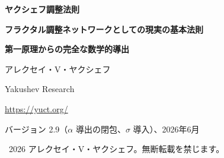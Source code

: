 \documentclass[12pt,a4paper]{article}
\theoremstyle{remark}
\begin{document}
	
	\begin{titlepage}
		\centering
		\vspace*{2cm}
		
		{\Huge\bfseries ヤクシェフ調整法則\par}
		\vspace{0.5cm}
		{\Large\bfseries フラクタル調整ネットワークとしての現実の基本法則\par}
		\vspace{0.3cm}
		{\Large\bfseries 第一原理からの完全な数学的導出\par}
		
		\vspace{1.5cm}
		
		{\large アレクセイ・V・ヤクシェフ\par}
		\vspace{0.3cm}
		{\normalsize Yakushev Research\par}
		\vspace{0.2cm}
		{\normalsize \url{https://yuct.org/}\par}
		
		\vspace{1.0cm}
		{\normalsize バージョン 2.9（$\alpha$ 導出の閉包、$\sigma$ 導入）、2026年6月\par}
		
		\vfill
		
		\begin{abstract}
			\noindent
			我々は、宇宙内のすべての安定構造を支配する基本原理であるヤクシェフ調整法則の完全な数学的導出を提示する。この法則は単一の文で定式化され、一つの公理（フラクタルスケール不変性）と調整プロトコル YPSDC の定義から導かれる。我々は三つの構造定理を証明する：最小辞書エントロピーは正確に 2 ビットであり、空間次元は必然的に 3 であり、時間は調整の不完全性の創発的尺度である。普遍的誤差法則は、その正しい定常べき則形式 $\varepsilon = \kappa_c \alpha K_{\mathrm{eff}}^{-\beta}$（$\beta=2/3$、$\kappa_c=1/3$）で導出される。代数的ループ定数は $S_{\mathrm{odd}}=1.2$、$S_{\mathrm{even}}=0.8$ である。スケール量子 $q = (3/2)^{1/3}$ は普遍的質量梯子を生成する。微細構造定数 $\alpha^{-1} \approx 137.036$ はコンパクトファイバー $F_{18}$ の位相不変量と普遍的シフト $\sigma = (S_{\mathrm{odd}}-S_{\mathrm{even}})/2 = 0.20$ から、いかなる経験的フィッティングもなしに導かれる。宇宙定数 $\Omega_\Lambda = 2/3$ は同じ位相から生じる。電弱スケールはワイルフェルミオン数 $L=96$ と幾何学的レギュレーター $(\kappa_c\pi_{\mathrm{YUCT}})^{-1/2}$ から得られ、いかなる現象論的フィッティングも排除する。さらに、同じ代数的ループが素数分布に対するパラメータフリーの漸近補正（定理~4）を与える。三つの形式化された公準——普遍的誤差法則、量子化された深さ、位相周期性——は、プランクスケールで制限された素数のゆらぎに対する閉じた解析モデルを提供する。この法則は、物理学、生物学、数論、宇宙論において八つの具体的かつ反証可能な予測を行い、調整可能な連続パラメータを一切含まない。
		\end{abstract}
		
		\vspace{1cm}
		\textcopyright\ 2026 アレクセイ・V・ヤクシェフ。無断転載を禁じます。
	\end{titlepage}
	
\end{document}
